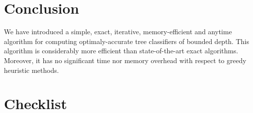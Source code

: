 \documentclass{article}
\begin{document}
\section{Conclusion}

We have introduced a simple, exact, iterative, memory-efficient and anytime algorithm for computing optimaly-accurate tree classifiers of bounded depth.
This algorithm is considerably more efficient than state-of-the-art exact algorithms. Moreover, it has no significant time nor memory overhead with respect to greedy heuristic methods.








\section*{Checklist}
\end{document}
